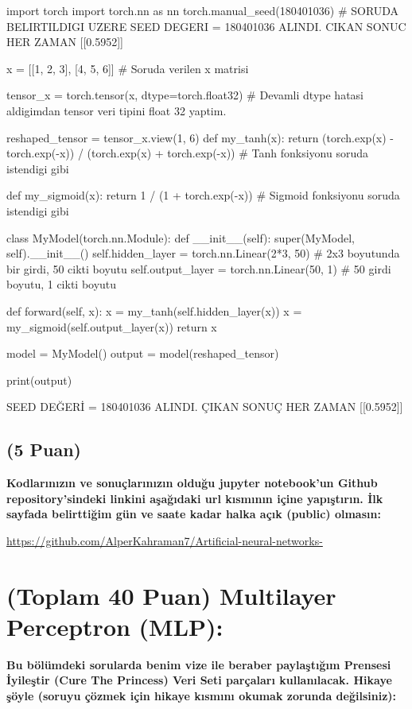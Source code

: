 \documentclass[11pt]{article}
\begin{document}
\begin{python}
import torch
import torch.nn as nn
torch.manual_seed(180401036)  # SORUDA BELIRTILDIGI UZERE SEED DEGERI = 180401036 ALINDI. CIKAN SONUC HER ZAMAN [[0.5952]]

x = [[1, 2, 3], [4, 5, 6]]                      # Soruda verilen x matrisi

tensor_x = torch.tensor(x, dtype=torch.float32)      # Devamli dtype hatasi aldigimdan tensor veri tipini float 32 yaptim.

reshaped_tensor = tensor_x.view(1, 6)           
def my_tanh(x):
    return (torch.exp(x) - torch.exp(-x)) / (torch.exp(x) + torch.exp(-x))     # Tanh fonksiyonu soruda istendigi gibi 

def my_sigmoid(x):
    return 1 / (1 + torch.exp(-x))                                             # Sigmoid fonksiyonu soruda istendigi gibi

class MyModel(torch.nn.Module):
    def __init__(self):
        super(MyModel, self).__init__()
        self.hidden_layer = torch.nn.Linear(2*3, 50)  # 2x3 boyutunda bir girdi, 50 cikti boyutu
        self.output_layer = torch.nn.Linear(50, 1)  # 50 girdi boyutu, 1 cikti boyutu


    def forward(self, x):
        x = my_tanh(self.hidden_layer(x))
        x = my_sigmoid(self.output_layer(x))
        return x

model = MyModel()
output = model(reshaped_tensor) 

print(output)
\end{python}

SEED DEĞERİ = 180401036 ALINDI. ÇIKAN SONUÇ HER ZAMAN [[0.5952]]

\subsection{(5 Puan)} \textbf{Kodlarınızın ve sonuçlarınızın olduğu jupyter notebook'un Github repository'sindeki linkini aşağıdaki url kısmının içine yapıştırın. İlk sayfada belirttiğim gün ve saate kadar halka açık (public) olmasın:}

\url{https://github.com/AlperKahraman7/Artificial-neural-networks-}

\newpage

\section{(Toplam 40 Puan) Multilayer Perceptron (MLP):} 
\textbf{Bu bölümdeki sorularda benim vize ile beraber paylaştığım Prensesi İyileştir (Cure The Princess) Veri Seti parçaları kullanılacak. Hikaye şöyle (soruyu çözmek için hikaye kısmını okumak zorunda değilsiniz):} 
\end{document}
